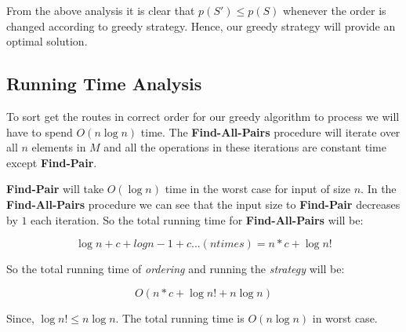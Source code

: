 \documentclass[8pt]{article}
\begin{document}
From the above analysis it is clear that $p(S') \leq p(S)$ whenever the order is changed according to greedy strategy. Hence, our greedy strategy will provide an optimal solution.

\subsection{Running Time Analysis}
To sort get the routes in correct order for our greedy algorithm to process we will have to spend $O(n\log{n})$ time. The \textbf{Find-All-Pairs} procedure will iterate over all $n$ elements in $M$ and all the operations in these iterations are constant time except \textbf{Find-Pair}.

\textbf{Find-Pair} will take $O(\log{n})$ time in the worst case for input of size $n$. In the \textbf{Find-All-Pairs} procedure we can see that the input size to \textbf{Find-Pair} decreases by $1$ each iteration. So the total running time for \textbf{Find-All-Pairs} will be:

$$\log{n} + c + log{n - 1} + c ...(n times) = n*c + \log{n!}$$

So the total running time of \textit{ordering} and running the \textit{strategy} will be:

$$O(n*c + \log{n!} + n\log{n})$$

Since, $\log{n!} \leq n\log{n}$. The total running time is $O(n\log{n})$ in worst case.
\end{document}
